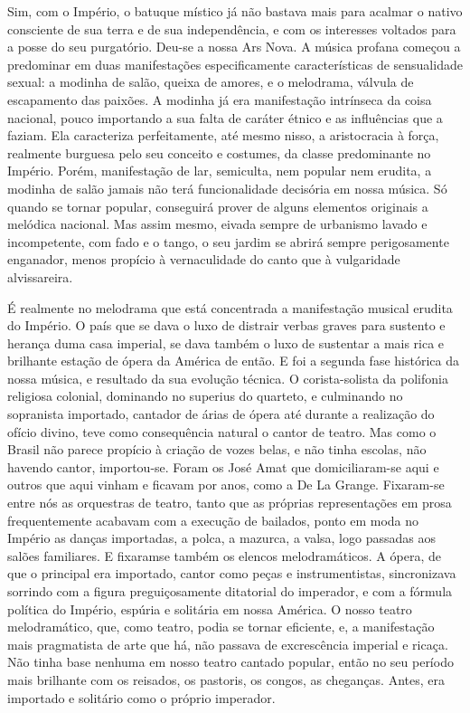 Sim, com o Império, o batuque místico já não bastava mais para acalmar o
nativo consciente de sua terra e de sua independência, e com os
interesses voltados para a posse do seu purgatório. Deu-se a nossa Ars
Nova. A música profana começou a predominar em duas manifestações
especificamente características de sensualidade sexual: a modinha de
salão, queixa de amores, e o melodrama, válvula de escapamento das
paixões. A modinha já era manifestação intrínseca da coisa nacional,
pouco importando a sua falta de caráter étnico e as influências que a
faziam. Ela caracteriza perfeitamente, até mesmo nisso, a aristocracia à
força, realmente burguesa pelo seu conceito e costumes, da classe
predominante no Império. Porém, manifestação de lar, semiculta, nem
popular nem erudita, a modinha de salão jamais não terá funcionalidade
decisória em nossa música. Só quando se tornar popular, conseguirá
prover de alguns elementos originais a melódica nacional. Mas assim
mesmo, eivada sempre de urbanismo lavado e incompetente, com fado e o
tango, o seu jardim se abrirá sempre perigosamente enganador, menos
propício à vernaculidade do canto que à vulgaridade alvissareira.

É realmente no melodrama que está concentrada a manifestação musical
erudita do Império. O país que se dava o luxo de distrair verbas graves
para sustento e herança duma casa imperial, se dava também o luxo de
sustentar a mais rica e brilhante estação de ópera da América de então.
E foi a segunda fase histórica da nossa música, e resultado da sua
evolução técnica. O corista-solista da polifonia religiosa colonial,
dominando no superius do quarteto, e culminando no sopranista importado,
cantador de árias de ópera até durante a realização do ofício divino,
teve como consequência natural o cantor de teatro. Mas como o Brasil não
parece propício à criação de vozes belas, e não tinha escolas, não
havendo cantor, importou-se. Foram os José Amat que domiciliaram-se aqui
e outros que aqui vinham e ficavam por anos, como a De La Grange.
Fixaram-se entre nós as orquestras de teatro, tanto que as próprias
representações em prosa frequentemente acabavam com a execução de
bailados, ponto em moda no Império as danças importadas, a polca, a
mazurca, a valsa, logo passadas aos salões familiares. E fixaramse
também os elencos melodramáticos. A ópera, de que o principal era
importado, cantor como peças e instrumentistas, sincronizava sorrindo
com a figura preguiçosamente ditatorial do imperador, e com a fórmula
política do Império, espúria e solitária em nossa América. O nosso
teatro melodramático, que, como teatro, podia se tornar eficiente, e, a
manifestação mais pragmatista de arte que há, não passava de
excrescência imperial e ricaça. Não tinha base nenhuma em nosso teatro
cantado popular, então no seu período mais brilhante com os reisados, os
pastoris, os congos, as cheganças. Antes, era importado e solitário como
o próprio imperador.

